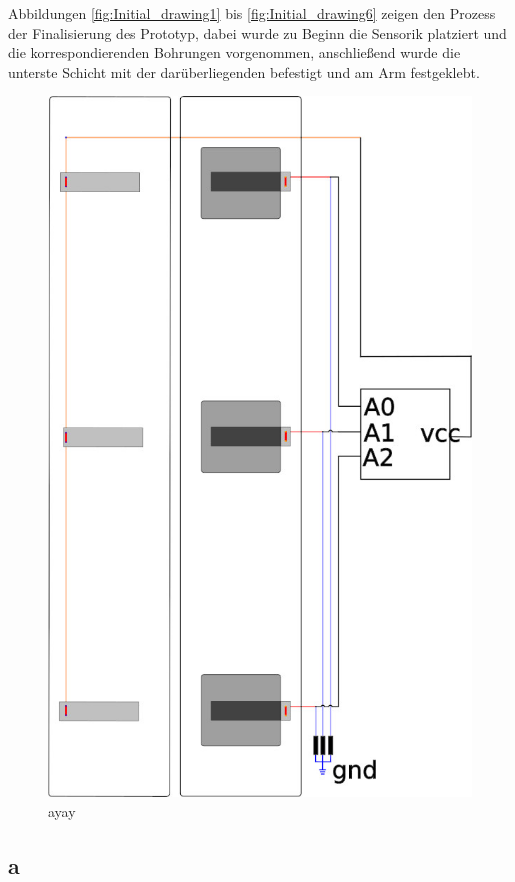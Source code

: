 \documentclass[11pt, a4paper]{article}
\begin{document}
Abbildungen \ref{fig:Initial_drawing1} bis \ref{fig:Initial_drawing6} zeigen den Prozess der Finalisierung des Prototyp, dabei wurde zu Beginn die Sensorik platziert und die korrespondierenden Bohrungen vorgenommen, anschließend wurde die unterste Schicht mit der darüberliegenden befestigt und am Arm festgeklebt.
\begin{figure}[ht]
\includegraphics[scale=.3]{assets/final_layout_drawing.jpg}
\caption{ayay}
\label{fig:final_layout}
\end{figure}


\subsection{a}
\end{document}
